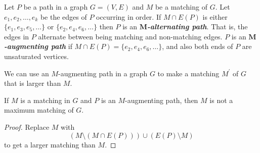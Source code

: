 \begin{defbox}
    \begin{definition}
        Let $ P $ be a path in a graph $ G=(V,E) $ and $ M $ be a matching of $ G $. Let
        $ e_1,e_2,\ldots ,e_k $ be the edges of $ P $ occurring in order. If $ M\cap E(P) $
        is either $ \{e_1,e_3,e_5,\ldots \} $ or $ \{e_2,e_4,e_6,\ldots\} $ then $ P $
        is an \textbf{\emph{$ \bm{M} $-alternating path}}. That is, the edges in $ P $
        alternate between being matching and non-matching edges. $ P $
        is an \textbf{\emph{$ \bm{M} $-augmenting path}} if $ M\cap E(P)=\{e_2,e_4,e_6,\ldots \} $,
        and also both ends of $ P $ are unsaturated vertices.
    \end{definition}
\end{defbox}
We can use an $ M $-augmenting path in a graph $ G $ to make a matching $ M^\prime $
of $ G $ that is larger than $ M $.

\begin{thmbox}
    \begin{prop}
        If $ M $ is a matching in $ G $ and $ P $ is an $ M $-augmenting path, then $ M $
        is not a maximum matching of $ G $.
    \end{prop}
\end{thmbox}
\begin{proof}
    Replace $ M $ with
    \[ \left( M\setminus (M\cap E(P)) \right)\cup (E(P)\setminus M) \]
    to get a larger matching than $ M $.
\end{proof}

